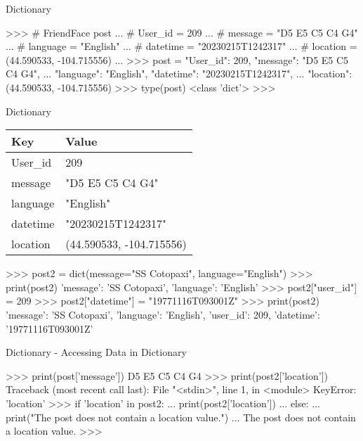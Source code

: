 \documentclass{beamer}
\begin{document}
\begin{frame}[fragile]{Dictionary}
\begin{pythoncode}
>>> # FriendFace post
... # User\_id = 209
... # message = "D5 E5 C5 C4 G4"
... # language = "English"
... # datetime = "20230215T1242317"
... # location = (44.590533, -104.715556)
... 
>>> post = {"User_id": 209, "message": "D5 E5 C5 C4 G4",
... "language": "English", "datetime": "20230215T1242317",
... "location": (44.590533, -104.715556)}
>>> type(post)
<class 'dict'>
>>> 
\end{pythoncode}
\end{frame}

\begin{frame}[fragile]{Dictionary}

\begin{center}
\begin{tabular}{ |l|l| }
  \hline
  \textbf{Key} & \textbf{Value} \\
  \hline
  User\_id     & 209 \\
  \hline
  message      & "D5 E5 C5 C4 G4" \\
  \hline
  language     & "English" \\
  \hline
  datetime     & "20230215T1242317" \\
  \hline
  location     & (44.590533, -104.715556) \\
  \hline
\end{tabular}
\end{center}

\begin{pythoncode}
>>> post2 = dict(message="SS Cotopaxi", language="English")
>>> print(post2)
{'message': 'SS Cotopaxi', 'language': 'English'}
>>> post2["user_id"] = 209
>>> post2["datetime"] = "19771116T093001Z"
>>> print(post2)
{'message': 'SS Cotopaxi', 'language': 'English', 
 'user_id': 209, 'datetime': '19771116T093001Z'}
\end{pythoncode}

\end{frame}

\begin{frame}[fragile]{Dictionary - Accessing Data in Dictionary}
\begin{pythoncode}
>>> print(post['message'])
D5 E5 C5 C4 G4
>>> print(post2['location'])
Traceback (most recent call last):
  File "<stdin>", line 1, in <module>
KeyError: 'location'
>>> if 'location' in post2:
...     print(post2['location'])
... else:
...     print("The post does not contain a location value.")
...
The post does not contain a location value.
>>> 
\end{pythoncode}
\end{frame}
\end{document}
